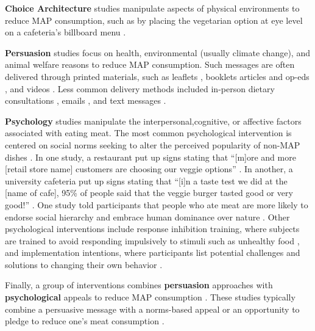 \documentclass[sn-nature,referee,pdflatex]{sn-jnl}
\begin{document}
\textbf{Choice Architecture} studies
\citep{andersson2021, kanchanachitra2020} manipulate aspects of physical
environments to reduce MAP consumption, such as by placing the
vegetarian option at eye level on a cafeteria's billboard menu
\citep{andersson2021}.

\textbf{Persuasion} studies
\citep{kanchanachitra2020, aberman2018, abrahamse2007, acharya2004, banerjee2019, bianchi2022, bochmann2017, bschaden2020, carfora2023, hennessy2016, piester2020, cooney2014, cooney2016, feltz2022, haile2021, hatami2018, jalil2023, mathur2021effectiveness, merrill2009, norris2014, peacock2017, polanco2022, sparkman2021, weingarten2022}
focus on health, environmental (usually climate change), and animal
welfare reasons to reduce MAP consumption. Such messages are often
delivered through printed materials, such as leaflets
\citep{haile2021, polanco2022}, booklets \citep{bianchi2022} articles
and op-eds \citep{sparkman2021, feltz2022}, and videos
\citep{sparkman2021, cooney2016, mathur2021effectiveness}. Less common
delivery methods included in-person dietary consultations
\citep{merrill2009}, emails \citep{banerjee2019}, and text messages
\citep{carfora2023}.

\textbf{Psychology} studies
\citep{aldoh2023, allen2002, camp2019, coker2022, piester2020, sparkman2020}
manipulate the interpersonal,cognitive, or affective factors associated
with eating meat. The most common psychological intervention is centered
on social norms seeking to alter the perceived popularity of non-MAP
dishes \citep{sparkman2020}. In one study, a restaurant put up signs
stating that ``{[}m{]}ore and more {[}retail store name{]} customers are
choosing our veggie options'' \citep{coker2022}. In another, a
university cafeteria put up signs stating that ``{[}i{]}n a taste test
we did at the {[}name of cafe{]}, 95\% of people said that the veggie
burger tasted good or very good!'' \citep{piester2020}. One study told
participants that people who ate meat are more likely to endorse social
hierarchy and embrace human dominance over nature \citep{allen2002}.
Other psychological interventions include response inhibition training,
where subjects are trained to avoid responding impulsively to stimuli
such as unhealthy food \citep{camp2019}, and implementation intentions,
where participants list potential challenges and solutions to changing
their own behavior \citep{aberman2018, shreedhar2021}.

Finally, a group of interventions combines \textbf{persuasion}
approaches with \textbf{psychological} appeals to reduce MAP consumption
\citep{aberman2018, berndsen2005, bertolaso2015, carfora2023, fehrenbach2015, hennessy2016, mathur2021effectiveness, mattson2020, piester2020, shreedhar2021}.
These studies typically combine a persuasive message with a norms-based
appeal \citep{piester2020, mattson2020} or an opportunity to pledge to
reduce one's meat consumption
\citep{mathur2021effectiveness, shreedhar2021}.
\end{document}
